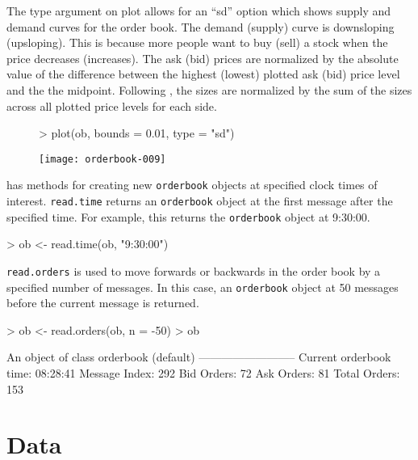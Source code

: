 \documentclass[a4paper]{report}
\begin{document}
\begin{article}
The type argument on plot allows for an ``sd'' option which shows
supply and demand curves for the order book. The demand (supply) curve
is downsloping (upsloping). This is because more people want to buy
(sell) a stock when the price decreases (increases). The ask (bid)
prices are normalized by the absolute value of the difference between
the highest (lowest) plotted ask (bid) price level and the the
midpoint. Following \cite{cao:orderbook}, the sizes are normalized by
the sum of the sizes across all plotted price levels for each
side.

\begin{figure}
  \centering
  \vspace*{.1in}
\begin{Schunk}
\begin{Sinput}
> plot(ob, bounds = 0.01, type = "sd")
\end{Sinput}
\end{Schunk}
\texttt{[image: orderbook-009]}
\end{figure}

 has methods for creating new \texttt{orderbook}
objects at specified clock times of interest. \texttt{read.time}
returns an \texttt{orderbook} object at the first message after the
specified time. For example, this returns the \texttt{orderbook}
object at 9:30:00.


\begin{Schunk}
\begin{Sinput}
> ob <- read.time(ob, "9:30:00")
\end{Sinput}
\end{Schunk}

\texttt{read.orders} is used to move forwards or backwards in the
order book by a specified number of messages. In this case, an
\texttt{orderbook} object at 50 messages before the current message is
returned.

\begin{Schunk}
\begin{Sinput}
> ob <- read.orders(ob, n = -50)
> ob
\end{Sinput}
\begin{Soutput}
An object of class orderbook (default)
--------------------------
Current orderbook time:    08:28:41 
Message Index:             292 
Bid Orders:                72 
Ask Orders:                81 
Total Orders:              153 
\end{Soutput}
\end{Schunk}

\section{Data}


\end{article}
\end{document}

